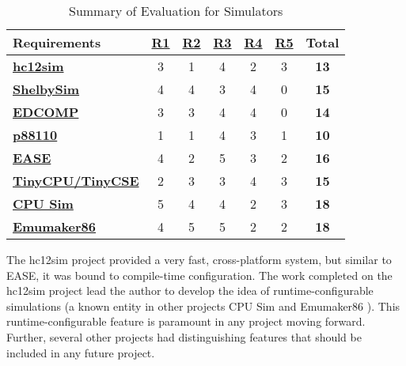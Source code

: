 \begin{table}[h!]
    \centering
    \begin{tabular}{lcccccc}
        \textbf{Requirements} & \textbf{\hyperref[req:personal]{R1}} & \textbf{\hyperref[req:configuration]{R2}} & \textbf{\hyperref[req:pedagogical]{R3}} & \textbf{\hyperref[req:simulations]{R4}} & \textbf{\hyperref[req:modern]{R5}} & \textbf{Total} \\ \hline
        
        \textbf{\hyperref[sec:review-prev-hc12sim]{hc12sim} \cite{Brightwell2013}} 
        & 3 & 1 & 4 & 2 & 3 & \textbf{13} \\
        \textbf{\hyperref[sec:review-shelbysim]{ShelbySim} \cite{Tappan2009, Tappan2009-2}} 
        & 4 & 4 & 3 & 4 & 0 & \textbf{15} \\
        \textbf{\hyperref[sec:review-edcomp]{EDCOMP} \cite{Djordjevic2005}}
        & 3 & 3 & 4 & 4 & 0 & \textbf{14} \\
        \textbf{\hyperref[sec:review-p88110]{p88110} \cite{Garcia2009}}
        & 1 & 1 & 4 & 3 & 1 & \textbf{10}  \\
        \textbf{\hyperref[sec:review-ease]{EASE} \cite{Skillen2011}}
        & 4 & 2 & 5 & 3 & 2 & \textbf{16} \\
        \textbf{\hyperref[sec:review-tiny-cse]{TinyCPU/TinyCSE} \cite{Nakamura2013,McLoughlin2010}} 
        & 2 & 3 & 3 & 4 & 3 & \textbf{15} \\
        \textbf{\hyperref[sec:review-cpu-sim]{CPU Sim} \cite{Skrien2001, Skrien2017}}
        & 5 & 4 & 4 & 2 & 3 & \textbf{18} \\
        \textbf{\hyperref[sec:review-emumaker86]{Emumaker86} \cite{Black2013}} 
        & 4 & 5 & 5 & 2 & 2 & \textbf{18} \\ 
    \end{tabular}
    \caption{Summary of Evaluation for Simulators}
    \label{table:simulator-evaluation-summary}
\end{table}

The hc12sim project provided a very fast, cross-platform system, but similar to EASE, it was bound to compile-time configuration. The work completed on the hc12sim project lead the author to develop the idea of runtime-configurable simulations (a known entity in other projects CPU Sim \cite{Skrien2001} and Emumaker86 \cite{Black2013}). This runtime-configurable feature is paramount in any project moving forward. Further, several other projects had distinguishing features that should be included in any future project. 

